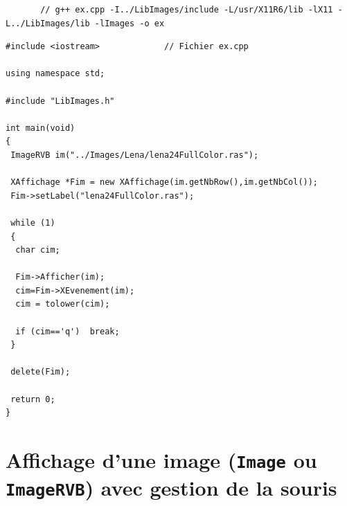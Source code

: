 \documentclass[12pt]{article}
\begin{document}
\begin{scriptsize}
\begin{verbatim}
       // g++ ex.cpp -I../LibImages/include -L/usr/X11R6/lib -lX11 -L../LibImages/lib -lImages -o ex 
\end{verbatim}
\end{scriptsize}

\begin{footnotesize}
\begin{verbatim}
#include <iostream>             // Fichier ex.cpp

using namespace std;

#include "LibImages.h"

int main(void)
{
 ImageRVB im("../Images/Lena/lena24FullColor.ras");

 XAffichage *Fim = new XAffichage(im.getNbRow(),im.getNbCol());
 Fim->setLabel("lena24FullColor.ras");

 while (1)
 {
  char cim;

  Fim->Afficher(im);
  cim=Fim->XEvenement(im);
  cim = tolower(cim);

  if (cim=='q')  break;
 }

 delete(Fim);

 return 0;
}
\end{verbatim}
\end{footnotesize}

\section{Affichage d'une image ({\tt Image} ou {\tt ImageRVB}) avec gestion
de la souris}
\end{document}
